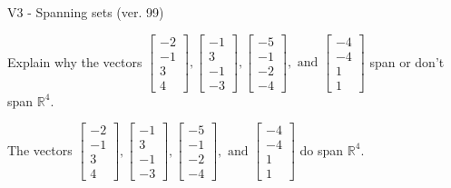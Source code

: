 \begin{exercise}
  \begin{exerciseTitle}V3 - Spanning sets (ver. 99)\end{exerciseTitle}
  \begin{exerciseStatement}
    Explain why the vectors \(\left[\begin{array}{r}
-2 \\
-1 \\
3 \\
4
\end{array}\right] , \left[\begin{array}{r}
-1 \\
3 \\
-1 \\
-3
\end{array}\right] , \left[\begin{array}{r}
-5 \\
-1 \\
-2 \\
-4
\end{array}\right] , \text{ and } \left[\begin{array}{r}
-4 \\
-4 \\
1 \\
1
\end{array}\right]\) span or don't span \(\mathbb{R}^4\). 
	


  \end{exerciseStatement}
  \begin{exerciseAnswer}
   The vectors \(\left[\begin{array}{r}
-2 \\
-1 \\
3 \\
4
\end{array}\right] , \left[\begin{array}{r}
-1 \\
3 \\
-1 \\
-3
\end{array}\right] , \left[\begin{array}{r}
-5 \\
-1 \\
-2 \\
-4
\end{array}\right] , \text{ and } \left[\begin{array}{r}
-4 \\
-4 \\
1 \\
1
\end{array}\right]\) 
  	 do  
	span \(\mathbb{R}^4\).
  


  \end{exerciseAnswer}
\end{exercise}